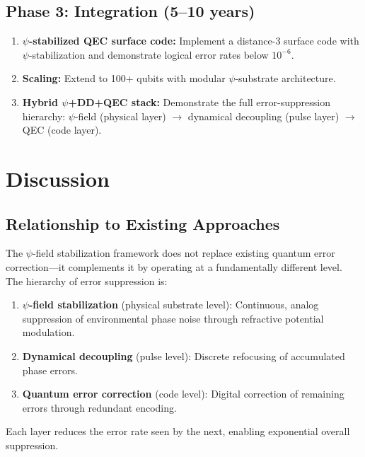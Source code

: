 \documentclass[aps,prd,twocolumn,superscriptaddress,nofootinbib]{revtex4-2}
\begin{document}
\subsection{Phase 3: Integration (5--10 years)}

\begin{enumerate}
\item \textbf{$\psi$-stabilized QEC surface code:}
Implement a distance-3 surface code with $\psi$-stabilization and
demonstrate logical error rates below $10^{-6}$.
\item \textbf{Scaling:}
Extend to 100+ qubits with modular $\psi$-substrate architecture.
\item \textbf{Hybrid $\psi$+DD+QEC stack:}
Demonstrate the full error-suppression hierarchy: $\psi$-field (physical
layer) $\to$ dynamical decoupling (pulse layer) $\to$ QEC (code layer).
\end{enumerate}

\section{Discussion}\label{sec:discussion}

\subsection{Relationship to Existing Approaches}

The $\psi$-field stabilization framework does not replace existing
quantum error correction---it complements it by operating at a
fundamentally different level. The hierarchy of error suppression is:

\begin{enumerate}
\item \textbf{$\psi$-field stabilization} (physical substrate level):
Continuous, analog suppression of environmental phase noise through
refractive potential modulation.
\item \textbf{Dynamical decoupling} (pulse level): Discrete refocusing
of accumulated phase errors.
\item \textbf{Quantum error correction} (code level): Digital correction
of remaining errors through redundant encoding.
\end{enumerate}

Each layer reduces the error rate seen by the next, enabling exponential
overall suppression.
\end{document}
